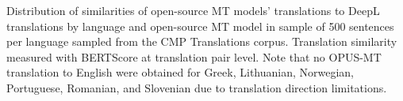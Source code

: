 Distribution of similarities of open-source MT models' translations to DeepL translations by language and open-source MT model in sample of 500 sentences per language sampled from the CMP Translations corpus. Translation similarity measured with BERTScore at translation pair level. Note that no OPUS-MT translation to English were obtained for Greek, Lithuanian, Norwegian, Portuguese, Romanian, and Slovenian due to translation direction limitations. \label{fig:bertscore_similarity_distributions_by_language_and_mt_model}
